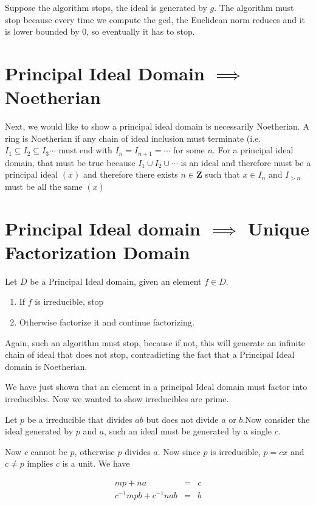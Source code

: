 \documentclass{article}
\begin{document}
Suppose the algorithm stops, the ideal is generated by $ g $. The algorithm must stop because every time we compute the gcd, the Euclidean norm reduces and it is lower bounded by 0, so eventually it has to stop.


\section{Principal Ideal Domain $ \implies $ Noetherian}
Next, we would like to show a principal ideal domain is necessarily Noetherian. A ring is Noetherian if any chain of ideal inclusion must terminate (i.e. $ I_1 \subseteq I_2 \subseteq I_3 \cdots $ must end with $ I_n = I_{n+1} = \cdots $ for some $ n $. For a principal ideal domain, that must be true because $ I_1 \cup I_2 \cup \cdots $ is an ideal and therefore must be a principal ideal $ (x) $ and therefore there exists $ n \in  \mathbf{Z} $ such that $ x \in I_n $ and $ I_{>n} $ must be all the same $ (x) $

\section{Principal Ideal domain $ \implies $ Unique Factorization Domain}
Let $ D $ be a Principal Ideal domain, given an element $ f \in D $. 

\begin{enumerate}
    \item If $ f $ is irreducible, stop
    \item Otherwise factorize it and continue factorizing.
\end{enumerate}
Again, such an algorithm must stop, because if not, this will generate an infinite chain of ideal that does not stop, contradicting the fact that a Principal Ideal domain is Noetherian.

We have just shown that an element in a principal Ideal domain must factor into irreducibles. Now we wanted to show irreducibles are prime.

Let $ p $ be a irreducible that divides $ ab $ but does not divide $ a $ or $ b $.Now consider the ideal generated by $ p $ and $ a $, such an ideal must be generated by a single $ c $.

Now $ c $ cannot be $ p $, otherwise $ p $ divides $ a $. Now since $ p $ is irreducible, $ p = c x $ and $ c \ne p $ implies $ c $ is a unit. We have 

\begin{eqnarray*}
  mp + na &=& c \\
  c^{-1}mpb + c^{-1}nab &=& b \\
\end{eqnarray*}
\end{document}
